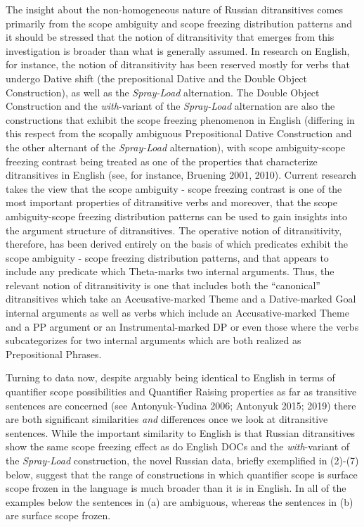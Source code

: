 \documentclass[12pt]{article}
\newenvironment{styleStandard}{\renewcommand\baselinestretch{1.0}\setlength\leftskip{0cm}\setlength\rightskip{0cm plus 1fil}\setlength\parindent{0cm}\setlength\parfillskip{0pt plus 1fil}\setlength\parskip{0in plus 1pt}\writerlistparindent\writerlistleftskip\leavevmode\normalfont\normalsize\writerlistlabel\ignorespaces}{\unskip\vspace{0.111in plus 0.0111in}\par}
\newcommand\writerlistleftskip{}
\newcommand\writerlistparindent{}
\newcommand\writerlistlabel{}
\begin{document}
\begin{styleStandard}
The insight about the non-homogeneous nature of Russian ditransitives comes primarily from the scope ambiguity and scope freezing distribution patterns and it should be stressed that the notion of ditransitivity that emerges from this investigation is broader than what is generally assumed. In research on English, for instance, the notion of ditransitivity has been reserved mostly for verbs that undergo Dative shift (the prepositional Dative and the Double Object Construction), as well as the \textit{Spray-Load} alternation. The Double Object Construction and the \textit{with}{}-variant of the \textit{Spray-Load} alternation are also the constructions that exhibit the scope freezing phenomenon in English (differing in this respect from the scopally ambiguous Prepositional Dative Construction and the other alternant of the \textit{Spray-Load} alternation), with scope ambiguity-scope freezing contrast being treated as one of the properties that characterize ditransitives in English (see, for instance, Bruening 2001, 2010). Current research takes the view that the scope ambiguity - scope freezing contrast is one of the most important properties of ditransitive verbs and moreover, that the scope ambiguity-scope freezing distribution patterns can be used to gain insights into the argument structure of ditransitives. The operative notion of ditransitivity, therefore, has been derived entirely on the basis of which predicates exhibit the scope ambiguity - scope freezing distribution patterns, and that appears to include any predicate which Theta-marks two internal arguments. Thus, the relevant notion of ditransitivity is one that includes both the “canonical” ditransitives which take an Accusative-marked Theme and a Dative-marked Goal internal arguments as well as verbs which include an Accusative-marked Theme and a PP argument or an Instrumental-marked DP or even those where the verbs subcategorizes for two internal arguments which are both realized as Prepositional Phrases. 
\end{styleStandard}

\begin{styleStandard}
Turning to data now, despite arguably being identical to English in terms of quantifier scope possibilities and Quantifier Raising properties as far as transitive sentences are concerned (see Antonyuk-Yudina 2006; Antonyuk 2015; 2019) there are both significant similarities \textit{and} differences once we look at ditransitive sentences. While the important similarity to English is that Russian ditransitives show the same scope freezing effect as do English DOCs and the \textit{with}{}-variant of the \textit{Spray-Load} construction, the novel Russian data, briefly exemplified in (2)-(7) below, suggest that the range of constructions in which quantifier scope is surface scope frozen in the language is much broader than it is in English. In all of the examples below the sentences in (a) are ambiguous, whereas the sentences in (b) are surface scope frozen. 
\end{styleStandard}
\end{document}
